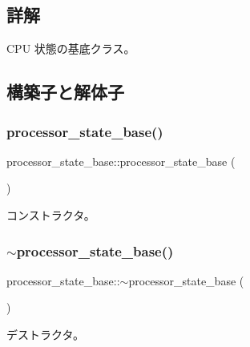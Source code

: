 \subsection{詳解}
C\+PU 状態の基底クラス。 

\subsection{構築子と解体子}
\hypertarget{classprocessor__state__base_afa639f99ceb2319a229882562145499e}{}\label{classprocessor__state__base_afa639f99ceb2319a229882562145499e} 
\subsubsection{\texorpdfstring{processor\+\_\+state\+\_\+base()}{processor\_state\_base()}\hspace{0.1cm}{\footnotesize\ttfamily [1/3]}}
{\footnotesize\ttfamily processor\+\_\+state\+\_\+base\+::processor\+\_\+state\+\_\+base (\begin{DoxyParamCaption}{ }\end{DoxyParamCaption})}

コンストラクタ。 \hypertarget{classprocessor__state__base_a79d61521ea6b3066bf03d3c7e2d1d977}{}\label{classprocessor__state__base_a79d61521ea6b3066bf03d3c7e2d1d977} 
\subsubsection{\texorpdfstring{$\sim$processor\+\_\+state\+\_\+base()}{~processor\_state\_base()}}
{\footnotesize\ttfamily processor\+\_\+state\+\_\+base\+::$\sim$processor\+\_\+state\+\_\+base (\begin{DoxyParamCaption}{ }\end{DoxyParamCaption})\hspace{0.3cm}{\ttfamily [virtual]}}

デストラクタ。 \hypertarget{classprocessor__state__base_a8a5444f4f1343d5a0ec699b08003f793}{}\label{classprocessor__state__base_a8a5444f4f1343d5a0ec699b08003f793} 
